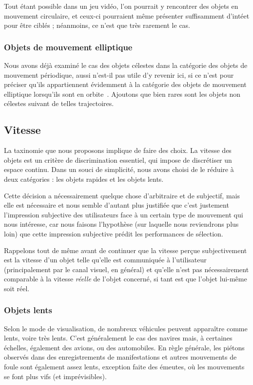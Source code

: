 	Tout étant possible dans un jeu vidéo, l'on pourrait y rencontrer des objets en mouvement circulaire, et ceux-ci pourraient même présenter suffisamment d'intéet pour être ciblés ; néanmoins, ce n'est que très rarement le cas.
	
	\subsubsection{Objets de mouvement elliptique}
	Nous avons déjà examiné le cas des objets célestes dans la catégorie des objets de mouvement périodique, aussi n'est-il pas utile d'y revenir ici, si ce n'est pour préciser qu'ils appartiennent évidemment à la catégorie des objets de mouvement elliptique lorsqu'ils sont en orbite~\cite{kepler1953epitome}. Ajoutons que bien rares sont les objets non célestes suivant de telles trajectoires.
	
	\subsection{Vitesse}
	La taxinomie que nous proposons implique de faire des choix. La vitesse des objets est un critère de discrimination essentiel, qui impose de discrétiser un espace continu. Dans un souci de simplicité, nous avons choisi de le réduire à deux catégories : les objets rapides et les objets lents.
	
	Cette décision a nécessairement quelque chose d'arbitraire et de subjectif, mais elle est nécessaire et nous semble d'autant plus justifiée que c'est justement l'impression subjective des utilisateurs face à un certain type de mouvement qui nous intéresse, car nous faisons l'hypothèse (sur laquelle nous reviendrons plus loin) que cette impression subjective prédit les performances de sélection.
	
	Rappelons tout de même avant de continuer que la vitesse perçue subjectivement est la vitesse d'un objet telle qu'elle est communiquée à l'utilisateur (principalement par le canal visuel, en général) et qu'elle n'est pas nécessairement comparable à la vitesse \emph{réelle} de l'objet concerné, si tant est que l'objet lui-même soit réel.
	
	\subsubsection{Objets lents}
	Selon le mode de visualisation, de nombreux véhicules peuvent apparaître comme lents, voire très lents. C'est généralement le cas des navires mais, à certaines échelles, également des avions, ou des automobiles. En règle générale, les piétons observés dans des enregistrements de manifestations et autres mouvements de foule sont également assez lents, exception faite des émeutes, où les mouvements se font plus vifs (et imprévisibles).
	
